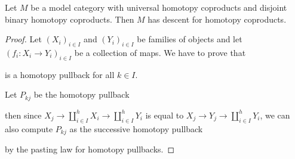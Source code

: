\begin{corollary}\label{cor:disjointImpliesDescent}
    Let $M$ be a model category with universal homotopy coproducts and disjoint binary homotopy coproducts.
    Then $M$ has descent for homotopy coproducts.
    \begin{proof}
        Let $\left(X_i\right)_{i\in I}$ and $\left(Y_i\right)_{i\in I}$ be families of objects and let $\left(f_i\colon X_i\to Y_i\right)_{i\in I}$ be a collection of maps.
        We have to prove that 
        \begin{center}
        \end{center}
        is a homotopy pullback for all $k\in I$.
        
        Let $P_{kj}$ be the homotopy pullback
        \begin{center}
        \end{center}
        then since $X_j\to\coprod\limits_{i\in I}^hX_i\to\coprod\limits_{i\in I}^hY_i$ is equal to $X_j\to Y_j\to\coprod\limits_{i\in I}^hY_i$, we can also compute $P_{kj}$ as the successive homotopy pullback
        \begin{center}
        \end{center}
        by the pasting law for homotopy pullbacks.


\end{proof}
\end{corollary}
